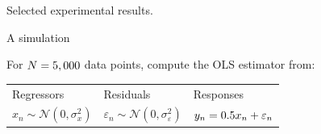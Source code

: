 \begin{frame}{Selected experimental results.}

%
%

{
\footnotesize
\MicrocreditProfitResultsTable{}
}


\end{frame}




\begin{frame}{A simulation}

For $N=5,000$ data points, compute the OLS estimator from:

\vspace{1em}
\begin{tabularx}{\textwidth}{YYY}
    Regressors  &   Residuals   &   Responses \\
    $x_n \sim \mathcal{N}(0, \sigma_x^2)$   &
    $\varepsilon_n \sim \mathcal{N}(0, \sigma_\varepsilon^2)$   &
    $y_n = 0.5 x_n + \varepsilon_n$
\end{tabularx}
%

\SimGridNormalGraph{}

\end{frame}
